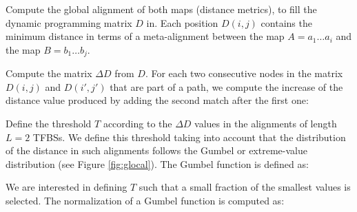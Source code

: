 \begin{menumerate}
\item
Compute the global alignment of both maps (distance metrics), to fill the 
dynamic programming matrix $D$ in. Each position $D(i,j)$ contains the 
minimum distance in terms of a meta-alignment between the map $A = a_1 \ldots a_i$ 
and the map $B = b_1 \ldots b_j$. 
\item
Compute the matrix $\Delta D$ from $D$. For each two consecutive nodes in the
matrix $D(i,j)$ and $D(i',j')$ that are part of a path, we compute the increase 
of the distance value produced by adding the second match after the first one:

\begin{center}
\end{center}

\item
Define the threshold $T$ according to the $\Delta D$ values in the alignments
of length $L=2$ TFBSs. We define this threshold taking into account that
the distribution of the distance in such alignments follows the Gumbel
or extreme-value distribution (see Figure \ref{fig:glocal}). The Gumbel
function is defined as:

\begin{center}
\end{center}

We are interested in defining $T$ such that a small fraction of the smallest 
values is selected. The normalization of a Gumbel function is computed as:

\begin{center}
\end{center}


\end{menumerate}
